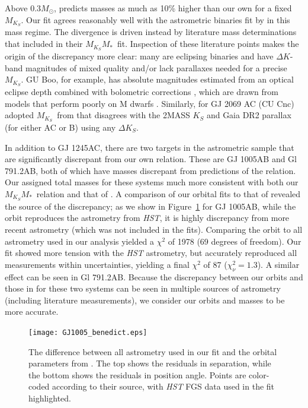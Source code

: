 \documentclass[twocolumn]{aastex62}
\newcommand{\mks}{$M_{K_S}$}
\newcommand{\mmk}{$M_{K_S}$\textendash$M_*$}
\begin{document}
 Above 0.3$M_\odot$, \citet{Benedict2016} predicts masses as much as 10\% higher than our own for a fixed \mks. Our fit agrees reasonably well with the astrometric binaries fit by \citet{Benedict2016} in this mass regime. The divergence is driven instead by literature mass determinations that \citet{Benedict2016} included in their \mmk\ fit. Inspection of these literature points makes the origin of the discrepancy more clear: many are eclipsing binaries and have $\Delta K$-band magnitudes of mixed quality and/or lack parallaxes needed for a precise \mks. GU Boo, for example, has absolute magnitudes estimated from an optical eclipse depth combined with bolometric corrections \citep{Lopez2005}, which are drawn from models that perform poorly on M dwarfs \citep{1998A&AS..130...65L,Hauschildt1999}. Similarly, for GJ 2069 AC (CU Cnc) \citet{Benedict2016} adopted \mks\ from \citet{Ribas2003} that disagrees with the 2MASS $K_S$ and Gaia DR2 parallax (for either AC or B) using any $\Delta K_S$. 
 
In addition to GJ 1245AC, there are two targets in the \citet{Benedict2016} astrometric sample that are significantly discrepant from our own relation. These are GJ 1005AB and Gl 791.2AB, both of which have masses discrepant from predictions of the \citet{Benedict2016} relation. Our assigned total masses for these systems much more consistent with both our \mmk\ relation and that of \citet{Benedict2016}.  A comparison of our orbital fits to that of \citet{Benedict2016} revealed the source of the discrepancy; as we show in Figure~\ref{fig:gj1005} for GJ 1005AB, while the \citet{Benedict2016} orbit reproduces the astrometry from {\it HST}, it is highly discrepancy from more recent astrometry (which was not included in the \citet{Benedict2016} fits). Comparing the \citet{Benedict2016} orbit to all astrometry used in our analysis yielded a $\chi^2$ of 1978 (69 degrees of freedom). Our fit showed more tension with the {\it HST} astrometry, but accurately reproduced all measurements within uncertainties, yielding a final $\chi^2$ of 87 ($\chi^2_\nu=1.3$). A similar effect can be seen in Gl 791.2AB. Because the discrepancy between our orbits and those in \citet{Benedict2016} for these two systems can be seen in multiple sources of astrometry (including literature measurements), we consider our orbits and masses to be more accurate. 
 
 \begin{figure}[htb]
\begin{center}
\texttt{[image: GJ1005\_benedict.eps]}
\caption{The difference between all astrometry used in our fit and the orbital parameters from \citet{Benedict2016}. The top shows the residuals in separation, while the bottom shows the residuals in position angle. Points are color-coded according to their source, with {\it HST} FGS data used in the \citet{Benedict2016} fit highlighted. }
\label{fig:gj1005}
\end{center}
\end{figure}
\end{document}
